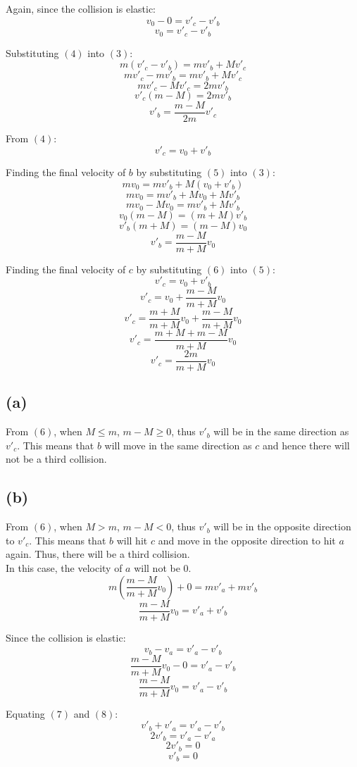 \documentclass[11pt]{article}
\begin{document}
Again, since the collision is elastic:
\[v_0 - 0 = v'_c - v'_b\]
\[v_0 = v'_c - v'_b \tag{4}\]

Substituting \((4)\) into \((3)\):
\[m(v'_c - v'_b) = mv'_b + Mv'_c\]
\[mv'_c - mv'_b = mv'_b + Mv'_c\]
\[mv'_c - Mv'_c = 2mv'_b\]
\[v'_c(m - M) = 2mv'_b\]
\[v'_b = \frac{m - M}{2m} v'_c\]

From \((4)\):
\[v'_c = v_0 + v'_b \tag{5}\]

Finding the final velocity of \(b\) by substituting \((5)\) into \((3)\):
\[mv_0 = mv'_b + M(v_0 + v'_b)\]
\[mv_0 = mv'_b + Mv_0 + Mv'_b\]
\[mv_0 - Mv_0 = mv'_b + Mv'_b\]
\[v_0(m - M) = (m + M)v'_b\]
\[v'_b(m + M) = (m - M)v_0\]
\[v'_b = \frac{m - M}{m + M}v_0 \tag{6}\]

Finding the final velocity of \(c\) by substituting \((6)\) into \((5)\):
\[v'_c = v_0 + v'_b\]
\[v'_c = v_0 + \frac{m - M}{m + M} v_0\]
\[v'_c = \frac{m + M}{m + M} v_0 + \frac{m - M}{m + M} v_0\]
\[v'_c = \frac{m + M + m - M}{m + M} v_0\]
\[v'_c = \frac{2m}{m + M} v_0\]

\subsection{(a)}
\label{sec:orga696547}
From \((6)\), when \(M \leq m\), \(m - M \ge 0\), thus \(v'_b\) will be in the same direction as \(v'_c\). This means that \(b\) will move in the same direction as \(c\) and hence there will not be a third collision.

\subsection{(b)}
\label{sec:org3c81ecd}

From \((6)\), when \(M > m\), \(m - M < 0\), thus \(v'_b\) will be in the opposite direction to \(v'_c\). This means that \(b\) will hit \(c\) and move in the opposite direction to hit \(a\) again. Thus, there will be a third collision.
\\[0pt]

In this case, the velocity of \(a\) will not be 0.
\[m \left( \frac{m - M}{m + M}v_0 \right) + 0 = mv'_a + mv'_b\]
\[\frac{m - M}{m + M}v_0 = v'_a + v'_b \tag{7}\]

Since the collision is elastic:
\[v_b - v_a = v'_a - v'_b\]
\[\frac{m - M}{m + M}v_0 - 0 = v'_a - v'_b\]
\[\frac{m - M}{m + M}v_0 = v'_a - v'_b \tag{8}\]

Equating \((7)\) and \((8)\):
\[v'_b + v'_a = v'_a - v'_b\]
\[2v'_b = v'_a - v'_a\]
\[2v'_b = 0\]
\[v'_b = 0\]
\end{document}
